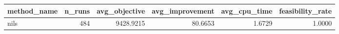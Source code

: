 \begin{tabular}{lrrrrr}
\toprule
method_name & n_runs & avg_objective & avg_improvement & avg_cpu_time & feasibility_rate \\
\midrule
nils & 484 & 9428.9215 & 80.6653 & 1.6729 & 1.0000 \\
\bottomrule
\end{tabular}
